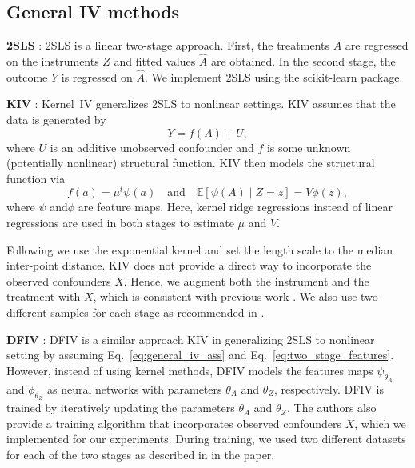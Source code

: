 \documentclass{article} %
\newcommand{\E}{\mathbb{E}}
\theoremstyle{definition}
\theoremstyle{plain}
\begin{document}
\subsection{General IV methods}

\textbf{2SLS} \citep{Wright.1928}: 2SLS \citep{Wright.1928} is a linear two-stage approach. First, the treatments $A$ are regressed on the instruments $Z$ and fitted values $\hat{A}$ are obtained. In the second stage, the outcome $Y$ is regressed on $\hat{A}$. We implement 2SLS using the scikit-learn package. 
 
\textbf{KIV} \citep{Singh.2019}: Kernel~IV \citep{Singh.2019} generalizes 2SLS to nonlinear settings. KIV assumes that the data is generated by
\begin{equation}\label{eq:general_iv_ass}
    Y = f(A) + U,
\end{equation}
where $U$ is an additive unobserved confounder and $f$ is some unknown (potentially nonlinear) structural function. KIV then models the structural function via
\begin{equation}\label{eq:two_stage_features}
    f(a) = \mu^t \psi(a) \quad \text{and} \quad \E[\psi(A) \mid Z = z] = V \phi(z),
\end{equation}
where $\psi$ and$\phi$ are feature maps. Here, kernel ridge regressions instead of linear regressions are used in both stages to estimate $\mu$ and $V$.

Following \citep{Singh.2019} we use the exponential kernel \citep{Rasmussen.2008} and set the length scale to the median inter-point distance. KIV does not provide a direct way to incorporate the observed confounders $X$. Hence, we augment both the instrument and the treatment with $X$, which is consistent with previous work \citep{Bennett.2019, Xu.2021}. We also use two different samples for each stage as recommended in \citep{Singh.2019}.

\textbf{DFIV} \citep{Xu.2021}: DFIV \citep{Xu.2021} is a similar approach KIV in generalizing 2SLS to nonlinear setting by assuming Eq.~\eqref{eq:general_iv_ass} and Eq.~\eqref{eq:two_stage_features}. However, instead of using kernel methods, DFIV models the features maps $\psi_{\theta_A}$ and $\phi_{\theta_Z}$ as neural networks with parameters $\theta_A$ and $\theta_Z$, respectively. DFIV is trained by iteratively updating the parameters $\theta_A$ and $\theta_Z$. The authors also provide a training algorithm that incorporates observed confounders $X$, which we implemented for our experiments. During training, we used two different datasets for each of the two stages as described in in the paper.
\end{document}
